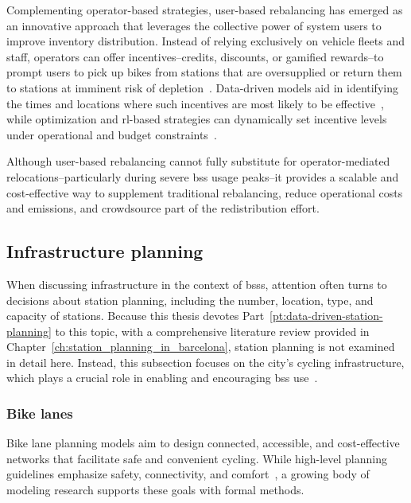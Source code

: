     Complementing operator-based strategies, user-based rebalancing has emerged as an innovative approach that leverages the collective power of system users to improve inventory distribution. Instead of relying exclusively on vehicle fleets and staff, operators can offer incentives--credits, discounts, or gamified rewards--to prompt users to pick up bikes from stations that are oversupplied or return them to stations at imminent risk of depletion~\cite{Fukushige2022, Chiariotti2020}. Data-driven models aid in identifying the times and locations where such incentives are most likely to be effective~\cite{Chiariotti2020}, while optimization and \ac{rl}-based strategies can dynamically set incentive levels under operational and budget constraints~\cite{Cheng2021, Pan2019}.
    
    Although user-based rebalancing cannot fully substitute for operator-mediated relocations--particularly during severe \ac{bss} usage peaks--it provides a scalable and cost-effective way to supplement traditional rebalancing, reduce operational costs and emissions, and crowdsource part of the redistribution effort.   

    
    \subsection{Infrastructure planning}

    When discussing infrastructure in the context of \acp{bss}, attention often turns to decisions about station planning, including the number, location, type, and capacity of stations. Because this thesis devotes Part~\ref{pt:data-driven-station-planning} to this topic, with a comprehensive literature review provided in Chapter~\ref{ch:station_planning_in_barcelona}, station planning is not examined in detail here. Instead, this subsection focuses on the city’s cycling infrastructure, which plays a crucial role in enabling and encouraging \ac{bss} use~\cite{Moran2025, Otero2018}. 
    
    \subsubsection{Bike lanes}

    Bike lane planning models aim to design connected, accessible, and cost-effective networks that facilitate safe and convenient cycling. While high-level planning guidelines emphasize safety, connectivity, and comfort~\cite{Yanocha2018}, a growing body of modeling research supports these goals with formal methods.

